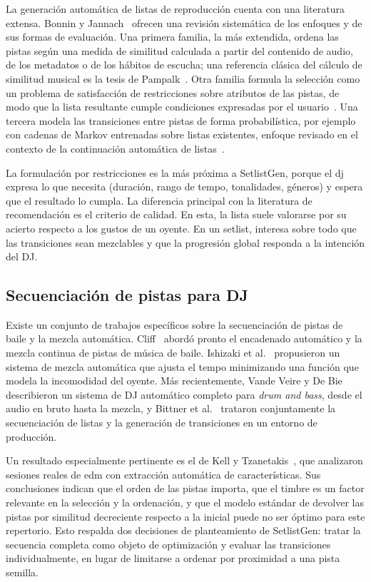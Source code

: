 La generación automática de listas de reproducción cuenta con una literatura extensa. Bonnin y Jannach~\cite{bonnin2014automated} ofrecen una revisión sistemática de los enfoques y de sus formas de evaluación. Una primera familia, la más extendida, ordena las pistas según una medida de similitud calculada a partir del contenido de audio, de los metadatos o de los hábitos de escucha; una referencia clásica del cálculo de similitud musical es la tesis de Pampalk~\cite{pampalk2006computational}. Otra familia formula la selección como un problema de satisfacción de restricciones sobre atributos de las pistas, de modo que la lista resultante cumple condiciones expresadas por el usuario~\cite{pachet2000combinatorial,aucouturier2002scaling}. Una tercera modela las transiciones entre pistas de forma probabilística, por ejemplo con cadenas de Markov entrenadas sobre listas existentes, enfoque revisado en el contexto de la continuación automática de listas~\cite{schedl2018current}.

La formulación por restricciones es la más próxima a SetlistGen, porque el \acs{dj} expresa lo que necesita (duración, rango de tempo, tonalidades, géneros) y espera que el resultado lo cumpla. La diferencia principal con la literatura de recomendación es el criterio de calidad. En esta, la lista suele valorarse por su acierto respecto a los gustos de un oyente. En un setlist, interesa sobre todo que las transiciones sean mezclables y que la progresión global responda a la intención del DJ.

\subsection{Secuenciación de pistas para DJ}

Existe un conjunto de trabajos específicos sobre la secuenciación de pistas de baile y la mezcla automática. Cliff~\cite{cliff2000hang} abordó pronto el encadenado automático y la mezcla continua de pistas de música de baile. Ishizaki et al.~\cite{ishizaki2009full} propusieron un sistema de mezcla automática que ajusta el tempo minimizando una función que modela la incomodidad del oyente. Más recientemente, Vande Veire y De Bie~\cite{vandeveire2018raw} describieron un sistema de DJ automático completo para \emph{drum and bass}, desde el audio en bruto hasta la mezcla, y Bittner et al.~\cite{bittner2017automatic} trataron conjuntamente la secuenciación de listas y la generación de transiciones en un entorno de producción.

Un resultado especialmente pertinente es el de Kell y Tzanetakis~\cite{kell2013empirical}, que analizaron sesiones reales de \acs{edm} con extracción automática de características. Sus conclusiones indican que el orden de las pistas importa, que el timbre es un factor relevante en la selección y la ordenación, y que el modelo estándar de devolver las pistas por similitud decreciente respecto a la inicial puede no ser óptimo para este repertorio. Esto respalda dos decisiones de planteamiento de SetlistGen: tratar la secuencia completa como objeto de optimización y evaluar las transiciones individualmente, en lugar de limitarse a ordenar por proximidad a una pista semilla.

